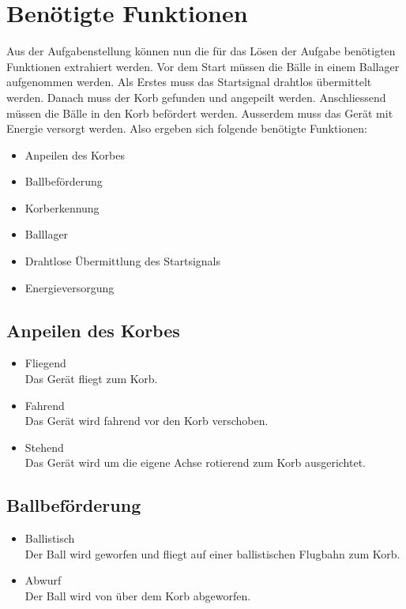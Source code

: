 \section{Benötigte Funktionen}
Aus der Aufgabenstellung können nun die für das Lösen der Aufgabe benötigten 
Funktionen extrahiert werden. Vor dem Start müssen die Bälle in einem Ballager 
aufgenommen werden. Als Erstes muss das Startsignal drahtlos übermittelt 
werden. Danach muss der Korb gefunden und angepeilt werden. Anschliessend 
müssen die Bälle in den Korb befördert werden. Ausserdem muss das Gerät mit 
Energie versorgt werden. Also ergeben sich folgende benötigte Funktionen: 
\begin{itemize}
    \item Anpeilen des Korbes
    \item Ballbeförderung
    \item Korberkennung
    \item Balllager
    \item Drahtlose Übermittlung des Startsignals
    \item Energieversorgung
\end{itemize}

\subsection{Anpeilen des Korbes}
\begin{itemize}
    \item Fliegend \\
        Das Gerät fliegt zum Korb. 
    \item Fahrend \\
        Das Gerät wird fahrend vor den Korb verschoben. 
    \item Stehend \\
        Das Gerät wird um die eigene Achse rotierend zum Korb ausgerichtet. 
\end{itemize}

\subsection{Ballbeförderung}
\begin{itemize}
    \item Ballistisch \\
        Der Ball wird geworfen und fliegt auf einer ballistischen Flugbahn zum 
        Korb. 
    \item Abwurf \\
        Der Ball wird von über dem Korb abgeworfen. 
\end{itemize}

